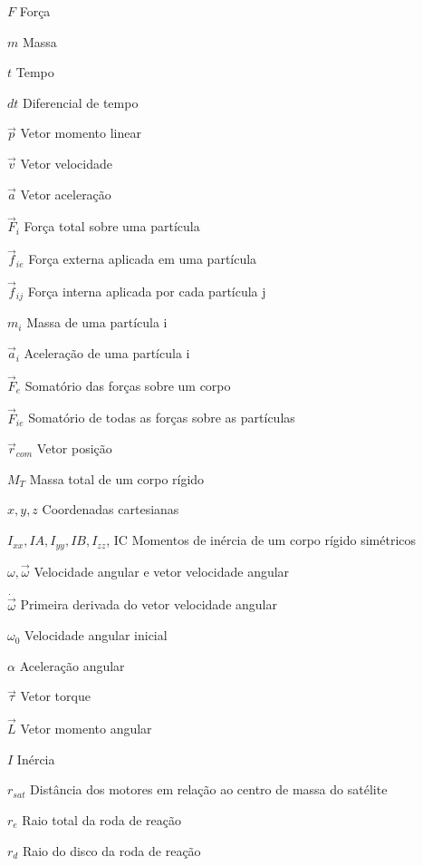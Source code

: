 \begin{simbolos}
  \item[$F$] Força
  \item[$m$] Massa
  \item[$t$] Tempo
  \item[$dt$] Diferencial de tempo
  \item[$\vec{p}$] Vetor momento linear
  \item[$\vec{v}$] Vetor velocidade
  \item[$\vec{a}$] Vetor aceleração
  \item[$\vec{F}_i$] Força total sobre uma partícula
  \item[$\vec{f}_{ie}$] Força externa aplicada em uma partícula
  \item[$\vec{f}_{ij}$] Força interna aplicada por cada partícula j
  \item[$m_i$] Massa de uma partícula i
  \item[$\vec{a}_i$] Aceleração de uma partícula i
  \item[$\vec{F}_e$] Somatório das forças sobre um corpo
  \item[$\vec{F}_{ie}$] Somatório de todas as forças sobre as partículas
  \item[$\vec{r}_{com}$] Vetor posição 
  \item[$M_T$] Massa total de um corpo rígido
  \item[$x,y,z$] Coordenadas cartesianas
  \item[$I_{xx}, IA, I_{yy}, IB, I_{zz}$, IC] Momentos de inércia de um corpo rígido simétricos 
  \item[$\omega,  \vec{\omega}$] Velocidade angular e vetor velocidade angular
  \item[$\dot{\vec{\omega}}$] Primeira derivada do vetor velocidade angular
  \item[$\omega_0$] Velocidade angular inicial
  \item[$\alpha$] Aceleração angular
  \item[$\vec{\tau}$] Vetor torque
  \item[$\vec{L}$] Vetor momento angular
  \item[$I$] Inércia
  \item[$r_{sat}$] Distância dos motores em relação ao centro de massa do satélite
  \item[$r_{e}$] Raio total da roda de reação
  \item[$r_{d}$] Raio do disco da roda de reação

\end{simbolos}
